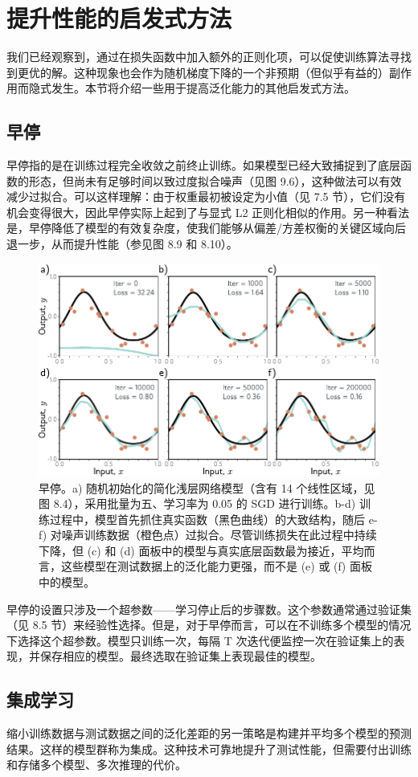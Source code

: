 \documentclass[lang=cn,newtx,10pt,scheme=chinese]{elegantbook}
\begin{document}
\section{提升性能的启发式方法}
我们已经观察到，通过在损失函数中加入额外的正则化项，可以促使训练算法寻找到更优的解。这种现象也会作为随机梯度下降的一个非预期（但似乎有益的）副作用而隐式发生。本节将介绍一些用于提高泛化能力的其他启发式方法。
\subsection{早停}
早停指的是在训练过程完全收敛之前终止训练。如果模型已经大致捕捉到了底层函数的形态，但尚未有足够时间以致过度拟合噪声（见图 9.6），这种做法可以有效减少过拟合。可以这样理解：由于权重最初被设定为小值（见 7.5 节），它们没有机会变得很大，因此早停实际上起到了与显式 L2 正则化相似的作用。另一种看法是，早停降低了模型的有效复杂度，使我们能够从偏差/方差权衡的关键区域向后退一步，从而提升性能（参见图 8.9 和 8.10）。

\begin{figure}[ht!]
	\centering
	\includegraphics[width=0.7\linewidth]{PDFFigures/UDLChap9PDF/RegEarly.pdf}
	\caption{早停。a) 随机初始化的简化浅层网络模型（含有 14 个线性区域，见图 8.4），采用批量为五、学习率为 0.05 的 SGD 进行训练。b-d) 训练过程中，模型首先抓住真实函数（黑色曲线）的大致结构，随后 e-f) 对噪声训练数据（橙色点）过拟合。尽管训练损失在此过程中持续下降，但 (c) 和 (d) 面板中的模型与真实底层函数最为接近，平均而言，这些模型在测试数据上的泛化能力更强，而不是 (e) 或 (f) 面板中的模型。}
\end{figure}


早停的设置只涉及一个超参数——学习停止后的步骤数。这个参数通常通过验证集（见 8.5 节）来经验性选择。但是，对于早停而言，可以在不训练多个模型的情况下选择这个超参数。模型只训练一次，每隔 T 次迭代便监控一次在验证集上的表现，并保存相应的模型。最终选取在验证集上表现最佳的模型。
\subsection{集成学习}
缩小训练数据与测试数据之间的泛化差距的另一策略是构建并平均多个模型的预测结果。这样的模型群称为集成。这种技术可靠地提升了测试性能，但需要付出训练和存储多个模型、多次推理的代价。
\end{document}

